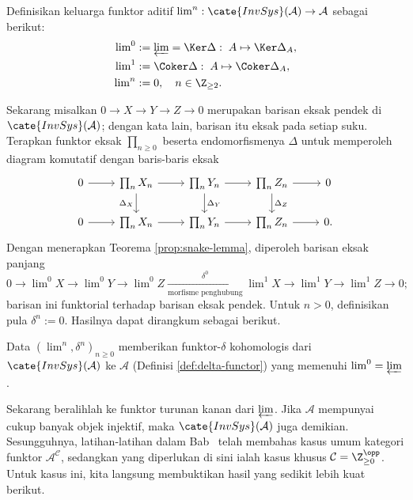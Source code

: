 \begin{definisi}
Definisikan keluarga funktor aditif
$\lim^n: \cate{InvSys}(\mathcal{A}) \to \mathcal{A}$ sebagai berikut:
\begin{align*}
	\lim\nolimits^0 & := \varprojlim = \Ker \Delta: \; A \mapsto \Ker \Delta_A, \\
	\lim\nolimits^1 & := \Coker \Delta: \; A \mapsto \Coker \Delta_A , \\
	\lim\nolimits^n & := 0, \quad n \in \Z_{\geq 2}.
\end{align*}
\end{definisi}

Sekarang misalkan $0 \to X \to Y \to Z \to 0$ merupakan barisan eksak
pendek di $\cate{InvSys}(\mathcal{A})$; dengan kata lain, barisan itu eksak
pada setiap suku. Terapkan funktor eksak $\prod_{n \geq 0}$ beserta
endomorfismenya $\Delta$ untuk memperoleh diagram komutatif dengan
baris-baris eksak
\[
\begin{tikzcd}
	0 \arrow[r] & \prod_n X_n \arrow[r] \arrow[d, "\Delta_X"'] & \prod_n Y_n \arrow[r] \arrow[d, "\Delta_Y"] & \prod_n Z_n \arrow[d, "\Delta_Z"] \arrow[r] & 0 \\
	0 \arrow[r] & \prod_n X_n \arrow[r] & \prod_n Y_n \arrow[r] & \prod_n Z_n \arrow[r] & 0 .
\end{tikzcd}
\]
Dengan menerapkan Teorema \ref{prop:snake-lemma}, diperoleh barisan eksak
panjang
\[ 0 \to \lim\nolimits^0 X \to \lim\nolimits^0 Y \to \lim\nolimits^0 Z \xrightarrow[\text{morfisme penghubung}]{\delta^0} \lim\nolimits^1 X \to \lim\nolimits^1 Y \to \lim\nolimits^1 Z \to 0 ; \]
barisan ini funktorial terhadap barisan eksak pendek. Untuk $n > 0$,
definisikan pula $\delta^n := 0$. Hasilnya dapat dirangkum sebagai berikut.

\begin{lema}
Data $\left( \lim^n, \delta^n \right)_{n \geq 0}$ memberikan
funktor-$\delta$ kohomologis dari $\cate{InvSys}(\mathcal{A})$ ke
$\mathcal{A}$ (Definisi \ref{def:delta-functor}) yang memenuhi
$\lim^0 = \varprojlim$.
\end{lema}

Sekarang beralihlah ke funktor turunan kanan dari $\varprojlim$. Jika
$\mathcal{A}$ mempunyai cukup banyak objek injektif, maka
$\cate{InvSys}(\mathcal{A})$ juga demikian. Sesungguhnya, latihan-latihan
dalam Bab~ telah membahas kasus umum kategori
funktor $\mathcal{A}^{\mathcal{C}}$, sedangkan yang diperlukan di sini ialah
kasus khusus $\mathcal{C} = \Z_{\geq 0}^{\opp}$. Untuk kasus ini, kita
langsung membuktikan hasil yang sedikit lebih kuat berikut.

